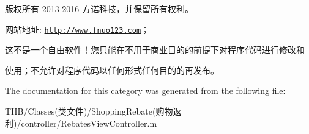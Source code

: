版权所有 2013-\/2016 方诺科技，并保留所有权利。

网站地址\+: \href{http://www.fnuo123.com}{\tt http\+://www.\+fnuo123.\+com}； 



这不是一个自由软件！您只能在不用于商业目的的前提下对程序代码进行修改和

使用；不允许对程序代码以任何形式任何目的的再发布。 

 

The documentation for this category was generated from the following file\+:\begin{DoxyCompactItemize}
\item 
T\+H\+B/\+Classes(类文件)/\+Shopping\+Rebate(购物返利)/controller/Rebates\+View\+Controller.\+m\end{DoxyCompactItemize}
